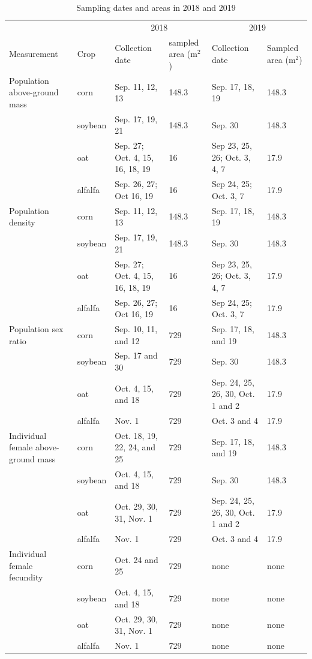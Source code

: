 \documentclass[
]{article}
\begin{document}
\begin{landscape}\begin{table}

\caption{\label{tab:sample-id}Sampling dates and areas in 2018 and 2019}
\centering
\fontsize{8}{10}\selectfont
\begin{tabular}[t]{llllll}
\toprule
\multicolumn{2}{c}{ } & \multicolumn{2}{c}{2018} & \multicolumn{2}{c}{2019} \\
\cmidrule(l{3pt}r{3pt}){3-4} \cmidrule(l{3pt}r{3pt}){5-6}
Measurement & Crop & Collection date & sampled area (m$^2$) & Collection date & Sampled area (m$^2$)\\
\midrule
Population above-ground mass & corn & Sep. 11, 12, 13 & 148.3 & Sep. 17, 18, 19 & 148.3\\
 & soybean & Sep. 17, 19, 21 & 148.3 & Sep. 30 & 148.3\\
 & oat & Sep. 27; Oct. 4, 15, 16, 18, 19 & 16 & Sep 23, 25, 26; Oct. 3, 4, 7 & 17.9\\
 & alfalfa & Sep. 26, 27; Oct 16, 19 & 16 & Sep 24, 25; Oct. 3, 7 & 17.9\\
Population density & corn & Sep. 11, 12, 13 & 148.3 & Sep. 17, 18, 19 & 148.3\\
 & soybean & Sep. 17, 19, 21 & 148.3 & Sep. 30 & 148.3\\
 & oat & Sep. 27; Oct. 4, 15, 16, 18, 19 & 16 & Sep 23, 25, 26; Oct. 3, 4, 7 & 17.9\\
 & alfalfa & Sep. 26, 27; Oct 16, 19 & 16 & Sep 24, 25; Oct. 3, 7 & 17.9\\
Population sex ratio & corn & Sep. 10, 11, and 12 & 729 & Sep. 17, 18, and 19 & 148.3\\
 & soybean & Sep. 17 and 30 & 729 & Sep. 30 & 148.3\\
 & oat & Oct. 4, 15, and 18 & 729 & Sep. 24, 25, 26, 30, Oct. 1 and 2 & 17.9\\
 & alfalfa & Nov. 1 & 729 & Oct. 3 and 4 & 17.9\\
Individual female above-ground mass & corn & Oct. 18, 19, 22,  24, and 25 & 729 & Sep. 17, 18, and 19 & 148.3\\
 & soybean & Oct. 4, 15, and 18 & 729 & Sep. 30 & 148.3\\
 & oat & Oct. 29, 30, 31, Nov. 1 & 729 & Sep. 24, 25, 26, 30, Oct. 1 and 2 & 17.9\\
 & alfalfa & Nov. 1 & 729 & Oct. 3 and 4 & 17.9\\
Individual female fecundity & corn & Oct. 24 and 25 & 729 & none & none\\
 & soybean & Oct. 4, 15, and 18 & 729 & none & none\\
 & oat & Oct. 29, 30, 31, Nov. 1 & 729 & none & none\\
 & alfalfa & Nov. 1 & 729 & none & none\\
\bottomrule
\end{tabular}
\end{table}
\end{landscape}
\end{document}
